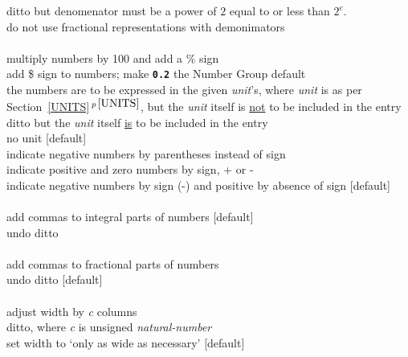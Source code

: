 \documentclass[12pt]{article}
\newcommand{\TT}[1]{{\tt \bfseries #1}}
\newcommand{\itemref}[1]{\ref{#1}$\,^{p\,\pageref{#1}}$}
\newcommand{\CIRCUM}{\textasciicircum}
\begin{document}
\GROUPENTRY[\em e]{f2\CIRCUM}
    ditto but denomenator must be a power of $2$ equal to or less
    than $2^e$. \\
    do not use fractional representations with demonimators
    \GROUPNEWLINE
    [default] \\
\ENDGROUP \\
 multiply numbers by 100 and add a \% sign \\
 add \$ sign to numbers; \GROUPNEWLINE
                make \TT{0.2} the Number Group default \\
\GROUPENTRY[\TT{`}\em unit\TT{'}]{u} the numbers are to be expressed in
		the given {\em unit}'s, where {\em unit} is as per
		Section~\itemref{UNITS}, but the {\em unit} itself
		is \underline{not} to be included in the entry\\
\GROUPENTRY[\TT{`}\em unit\TT{'}]{U} ditto but
		the {\em unit} itself
		\underline{is} to be included in the entry\\
 no unit [default]
\ENDGROUP \\
 indicate negative numbers by parentheses instead of sign \\
 indicate positive and zero numbers by sign, + or - \\
 indicate negative numbers by sign (-) and positive by absence
               of sign [default] \\
\ENDGROUP \\
 add commas to integral parts of numbers [default] \\
 undo ditto \\
\ENDGROUP \\
 add commas to fractional parts of numbers \\
 undo ditto [default] \\
\ENDGROUP \\
    adjust width by {\em c} columns \\
\GROUPENTRY[\em c]{}
    ditto, where {\em c} is unsigned {\em natural-number} \\
    set width to `only as wide as necessary' [default] \\
\ENDGROUP \\
\end{document}
